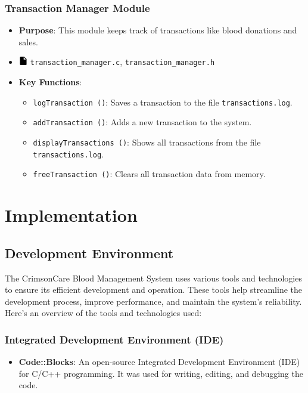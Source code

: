 \documentclass[12pt,a4paper]{report}
\begin{document}
\subsection{Transaction Manager Module}
\begin{itemize}
    \item \normalsize \textbf{Purpose}: This module keeps track of transactions like blood donations and sales.
    \item \normalsize \includegraphics[width=0.03\textwidth]{../resources/assets/images/file_icon.png} \texttt{transaction\_manager.c}, \texttt{transaction\_manager.h}
    \item \normalsize \textbf{Key Functions}:
    \begin{itemize}
        \item \texttt{logTransaction ()}: Saves a transaction to the file \texttt{transactions.log}.
        \item \texttt{addTransaction ()}: Adds a new transaction to the system.
        \item \texttt{displayTransactions ()}: Shows all transactions from the file \texttt{transactions.log}.
        \item \texttt{freeTransaction ()}: Clears all transaction data from memory.
    \end{itemize}
\end{itemize}

\chapter{Implementation}
\section{Development Environment}
The CrimsonCare Blood Management System uses various tools and technologies to ensure its efficient development and operation.
These tools help streamline the development process, improve performance, and maintain the system's reliability.
Here's an overview of the tools and technologies used:

\subsection*{Integrated Development Environment (IDE)}
\begin{itemize}
    \item \textbf{Code::Blocks}: An open-source Integrated Development Environment (IDE) for C/C++ programming.
    It was used for writing, editing, and debugging the code.
\end{itemize}
\end{document}
